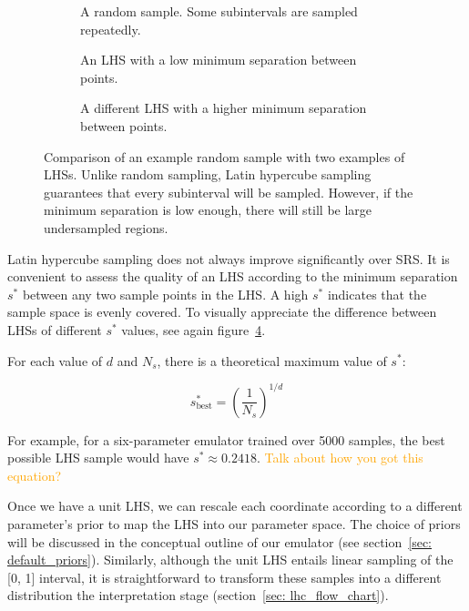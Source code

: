 \begin{figure}[ht!]
    \begin{subfigure}{0.32 \textwidth}
    \centering
 		
 		\caption{A random sample. Some subintervals are sampled repeatedly.}
 		\label{fig: random_sample}
    \end{subfigure}
    \begin{subfigure}{0.32 \textwidth}
    \centering
 		
 		\caption{An LHS with a low minimum separation between points.}
 		\label{fig: poor_lhs}
    \end{subfigure}
    \begin{subfigure}{0.32 \textwidth}
    \centering
 		
 		\caption{A different LHS with a higher minimum separation between
 			points.}
 		\label{fig: better_lhs}
    \end{subfigure}
    \centering
    \caption[Comparison of SRS and Latin hypercube sampling.]{Comparison of an 
    example
    	random sample with two examples of LHSs. Unlike random sampling,
    	Latin hypercube sampling guarantees that every subinterval will be 
    	sampled. However, if
    	the minimum separation is low enough, there will still be large
    	undersampled regions.}
    \label{fig: sample_comparison}
\end{figure}

Latin hypercube sampling does not always improve significantly over SRS. It is 
convenient to
assess the quality of an LHS according to the minimum separation $s^*$ 
between any two sample points in the LHS. A high $s^*$ indicates that 
the sample space is evenly covered. To visually appreciate the difference 
between LHSs of different $s^*$ values, see again
figure~\ref{fig: sample_comparison}.

For each value of $d$ and $N_s$, there is a theoretical maximum value of
$s^*$:

\begin{equation}
\label{eq: best_lhs_sep}
s^*_\text{best} = \left( \frac{1}{N_s} \right)^{1 / d}
\end{equation}

For example, for a six-parameter emulator trained over 5000 samples, the best
possible LHS sample would have $s^* \approx 0.2418$.
\textcolor{orange}{Talk about how you got this equation?}

Once we have a unit LHS, we can rescale each coordinate according to a 
different parameter's prior to map the LHS into our parameter space. The
choice of priors will be discussed in the conceptual outline of our
emulator (see section~\ref{sec: default_priors}). Similarly,
although the unit LHS entails linear sampling of the [0, 1] interval, it is 
straightforward to transform these samples into a different distribution
the interpretation stage (section~\ref{sec: lhc_flow_chart}).

